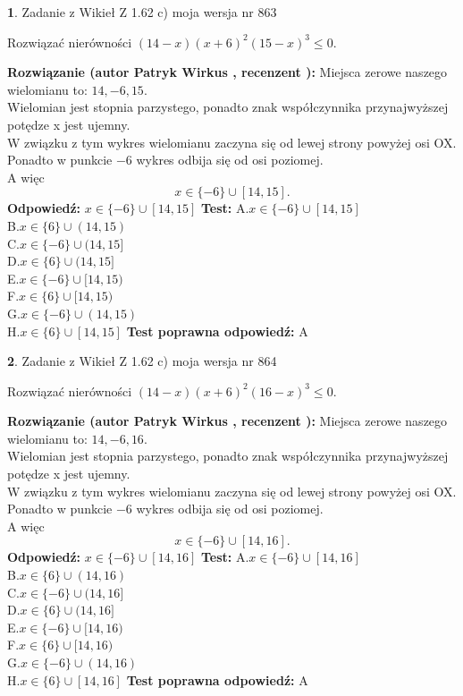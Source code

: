 \documentclass[12pt, a4paper]{article}
\theoremstyle{definition} %
\newtheorem{zad}{}
\newcommand{\zadStart}[1]{\begin{zad}#1\newline}
\newcommand{\zadStop}{\end{zad}}
\newcommand{\rozwStart}[2]{\noindent \textbf{Rozwiązanie (autor #1 , recenzent #2): }\newline}
\newcommand{\rozwStop}{\newline}
\newcommand{\odpStart}{\noindent \textbf{Odpowiedź:}\newline}
\newcommand{\odpStop}{\newline}
\newcommand{\testStart}{\noindent \textbf{Test:}\newline}
\newcommand{\testStop}{\newline}
\newcommand{\kluczStart}{\noindent \textbf{Test poprawna odpowiedź:}\newline}
\newcommand{\kluczStop}{\newline}
\begin{document}
\zadStart{Zadanie z Wikieł Z 1.62 c) moja wersja nr 863}

Rozwiązać nierówności $(14-x)(x+6)^{2}(15-x)^{3}\le0$.
\zadStop
\rozwStart{Patryk Wirkus}{}
Miejsca zerowe naszego wielomianu to: $14, -6, 15$.\\
Wielomian jest stopnia parzystego, ponadto znak współczynnika przy\linebreak najwyższej potędze x jest ujemny.\\ W związku z tym wykres wielomianu zaczyna się od lewej strony powyżej osi OX.\\
Ponadto w punkcie $-6$ wykres odbija się od osi poziomej.\\
A więc $$x \in \{-6\} \cup [14,15].$$
\rozwStop
\odpStart
$x \in \{-6\} \cup [14,15]$
\odpStop
\testStart
A.$x \in \{-6\} \cup [14,15]$\\
B.$x \in \{6\} \cup (14,15)$\\
C.$x \in \{-6\} \cup (14,15]$\\
D.$x \in \{6\} \cup (14,15]$\\
E.$x \in \{-6\} \cup [14,15)$\\
F.$x \in \{6\} \cup [14,15)$\\
G.$x \in \{-6\} \cup (14,15)$\\
H.$x \in \{6\} \cup [14,15]$
\testStop
\kluczStart
A
\kluczStop



\zadStart{Zadanie z Wikieł Z 1.62 c) moja wersja nr 864}

Rozwiązać nierówności $(14-x)(x+6)^{2}(16-x)^{3}\le0$.
\zadStop
\rozwStart{Patryk Wirkus}{}
Miejsca zerowe naszego wielomianu to: $14, -6, 16$.\\
Wielomian jest stopnia parzystego, ponadto znak współczynnika przy\linebreak najwyższej potędze x jest ujemny.\\ W związku z tym wykres wielomianu zaczyna się od lewej strony powyżej osi OX.\\
Ponadto w punkcie $-6$ wykres odbija się od osi poziomej.\\
A więc $$x \in \{-6\} \cup [14,16].$$
\rozwStop
\odpStart
$x \in \{-6\} \cup [14,16]$
\odpStop
\testStart
A.$x \in \{-6\} \cup [14,16]$\\
B.$x \in \{6\} \cup (14,16)$\\
C.$x \in \{-6\} \cup (14,16]$\\
D.$x \in \{6\} \cup (14,16]$\\
E.$x \in \{-6\} \cup [14,16)$\\
F.$x \in \{6\} \cup [14,16)$\\
G.$x \in \{-6\} \cup (14,16)$\\
H.$x \in \{6\} \cup [14,16]$
\testStop
\kluczStart
A
\kluczStop
\end{document}
